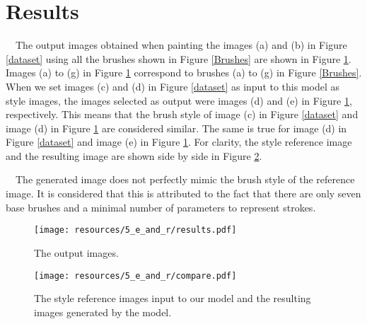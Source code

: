 \section{Results}
　The output images obtained when painting the images (a) and (b) in Figure \ref{dataset} 
using all the brushes shown in Figure \ref{Brushes} are shown in Figure \ref{results}.
Images (a) to (g) in Figure \ref{results} correspond to brushes (a) to (g) in Figure \ref{Brushes}.
When we set images (c) and (d) in Figure \ref{dataset} as input to this 
model as style images, the images selected as output were images (d) and (e) 
in Figure \ref{results}, respectively.
This means that the brush style of image (c) in Figure \ref{dataset} and image 
(d) in Figure \ref{results} are considered similar. The same is true for image 
(d) in Figure \ref{dataset} and image (e) in Figure \ref{results}.
For clarity, the style reference image and the resulting image are shown side 
by side in Figure \ref{compare}.

　The generated image does not perfectly mimic the brush style of the reference 
image. 
It is considered that this is attributed to the fact that there are only seven 
base brushes and a minimal number of parameters to represent strokes.

\begin{figure}[p]
    \centering
    \texttt{[image: resources/5\_e\_and\_r/results.pdf]}
    \caption{
        The output images.
    }
    \label{results}
\end{figure}

\begin{figure}[h]
    \centering
    \texttt{[image: resources/5\_e\_and\_r/compare.pdf]}
    \caption{
        The style reference images input to our model and the resulting 
        images generated by the model.
    }
    \label{compare}
\end{figure}